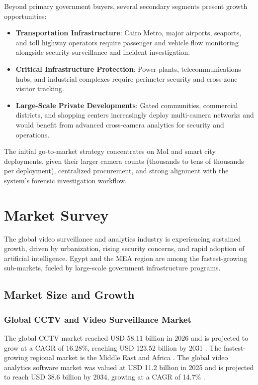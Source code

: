 Beyond primary government buyers, several secondary segments present growth opportunities:
\begin{itemize}
    \item \textbf{Transportation Infrastructure}: Cairo Metro, major airports, seaports, and toll highway operators require passenger and vehicle flow monitoring alongside security surveillance and incident investigation.
    \item \textbf{Critical Infrastructure Protection}: Power plants, telecommunications hubs, and industrial complexes require perimeter security and cross-zone visitor tracking.
    \item \textbf{Large-Scale Private Developments}: Gated communities, commercial districts, and shopping centers increasingly deploy multi-camera networks and would benefit from advanced cross-camera analytics for security and operations.
\end{itemize}

The initial go-to-market strategy concentrates on MoI and smart city deployments, given their larger camera counts (thousands to tens of thousands per deployment), centralized procurement, and strong alignment with the system's forensic investigation workflow.

\section{Market Survey}

The global video surveillance and analytics industry is experiencing sustained growth, driven by urbanization, rising security concerns, and rapid adoption of artificial intelligence. Egypt and the MEA region are among the fastest-growing sub-markets, fueled by large-scale government infrastructure programs.

\subsection{Market Size and Growth}

\subsubsection{Global CCTV and Video Surveillance Market}

The global CCTV market reached USD 58.11 billion in 2026 and is projected to grow at a CAGR of 16.28\%, reaching USD 123.52 billion by 2031 \cite{mordorintelligence_cctv}. The fastest-growing regional market is the Middle East and Africa \cite{mordorintelligence_cctv}. The global video analytics software market was valued at USD 11.2 billion in 2025 and is projected to reach USD 38.6 billion by 2034, growing at a CAGR of 14.7\% \cite{marketintelo_analytics}.

